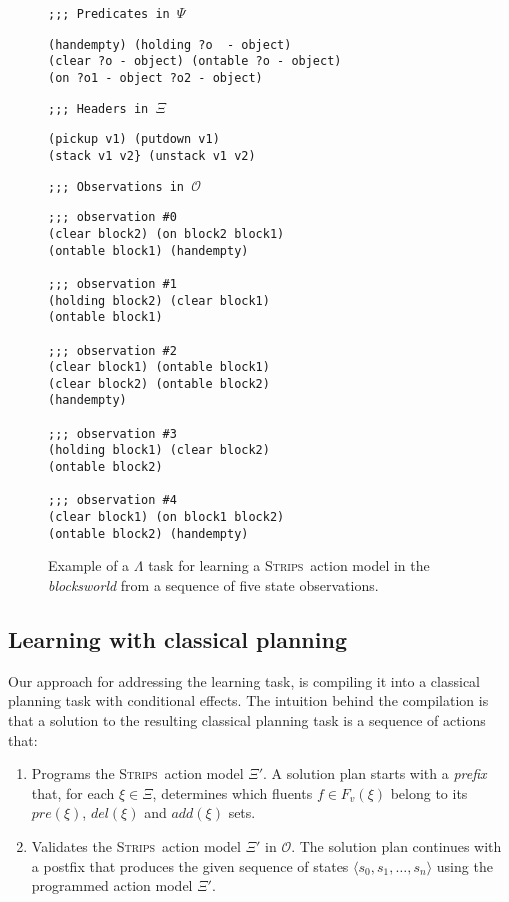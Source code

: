 \documentclass{article}
\newcommand{\tup}[1]{{\langle #1 \rangle}}
\newcommand{\strips}{\textsc{Strips}}     %
\begin{document}
\begin{figure}[hbt!]
{\footnotesize\tt ;;; Predicates in $\Psi$}
\begin{footnotesize}
\begin{verbatim}
(handempty) (holding ?o  - object)
(clear ?o - object) (ontable ?o - object)
(on ?o1 - object ?o2 - object)
\end{verbatim}
\end{footnotesize}
\vspace{0.2cm}
{\footnotesize\tt ;;; Headers in $\Xi$}
\begin{footnotesize}
\begin{verbatim}
(pickup v1) (putdown v1) 
(stack v1 v2} (unstack v1 v2)
\end{verbatim}
\end{footnotesize}
\vspace{0.2cm}
{\footnotesize\tt ;;; Observations in $\mathcal{O}$}
\begin{footnotesize}
\begin{verbatim}
;;; observation #0
(clear block2) (on block2 block1) 
(ontable block1) (handempty) 

;;; observation #1
(holding block2) (clear block1) 
(ontable block1)

;;; observation #2
(clear block1) (ontable block1) 
(clear block2) (ontable block2) 
(handempty) 

;;; observation #3
(holding block1) (clear block2) 
(ontable block2)

;;; observation #4
(clear block1) (on block1 block2) 
(ontable block2) (handempty) 
\end{verbatim}
\end{footnotesize}
 \caption{\small Example of a $\Lambda$ task for learning a \strips\ action model in the {\em blocksworld} from a sequence of five state observations.}
\label{fig:lexample}
\end{figure}


\subsection{Learning with classical planning}

Our approach for addressing the learning task, is compiling it into a classical planning task with conditional effects. The intuition behind the compilation is that a solution to the resulting classical planning task is a sequence of actions that:
\begin{enumerate}
\item Programs the \strips\ action model $\Xi'$. A solution plan starts with a {\em prefix} that, for each $\xi\in\Xi$, determines which fluents $f\in F_v(\xi)$ belong to its $pre(\xi)$, $del(\xi)$ and $add(\xi)$ sets.
\item Validates the \strips\ action model $\Xi'$ in $\mathcal{O}$. The solution plan continues with a postfix that produces the given sequence of states $\tup{s_0,s_1,\ldots,s_{n}}$ using the programmed action model $\Xi'$. 
\end{enumerate}
\end{document}
